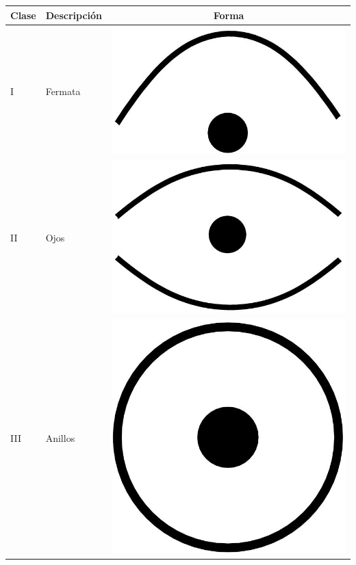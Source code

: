 \begin{table}
  \begin{tabular}{llc}
    \toprule
    Clase & Descripción & Forma \\
    \midrule
    I & Fermata & \includegraphics[scale=0.03]{./Figures/fermata} \\
    II & Ojos   & \includegraphics[scale=0.03]{./Figures/eyes} \\
    III & Anillos & \includegraphics[scale=0.02]{./Figures/ring} \\

\end{tabular}
\end{table}
